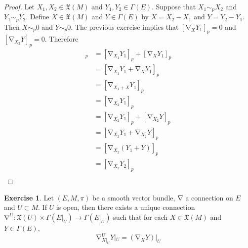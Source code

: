 \documentclass{book}
\theoremstyle{definition}
\newtheorem{ex}[definition]{Exercise}
\newcommand{\Gam}{\Gamma}
\newcommand{\MFX}{\mathfrak{X}}
\DeclareMathOperator{\nab}{\nabla}
\DeclareMathOperator*{\0}{\mbf{0}}
\DeclareMathOperator*{\1}{\mbf{1}}
\begin{document}
	\begin{proof}
		Let $X_1, X_2 \in \MFX(M)$ and $Y_1, Y_2 \in \Gam(E)$. Suppose that $X_1 \sim_p X_2$ and $Y_1 \sim_p Y_2$. Define $X \in \MFX(M)$ and $Y \in \Gam(E)$ by $X = X_2 - X_1$ and $Y = Y_2 - Y_1$. Then $X \sim_p 0$ and $Y \sim_p 0$. The previous exercise implies that $[\nab_{X}Y_1]_p = 0$ and $[\nab_{X_2} Y]_p = 0$. Therefore
		\begin{align*}
			[\nab_{X_1} Y_1]_p
			& = [\nab_{X_1} Y_1]_p + [\nab_X Y_1]_p \\
			& = [\nab_{X_1} Y_1 + \nab_X Y_1]_p \\
			& = [\nab_{X_1 + X} Y_1]_p \\
			& = [\nab_{X_2} Y_1]_p \\
			& = [\nab_{X_2} Y_1]_p + [\nab_{X_2} Y]_p \\
			& = [\nab_{X_2} Y_1 + \nab_{X_2} Y]_p \\
			& = [\nab_{X_2} (Y_1 + Y)]_p \\
			& = [\nab_{X_2} Y_2]_p \\
		\end{align*}
	\end{proof}

	\begin{ex}
		Let $(E, M, \pi)$ be a smooth vector bundle, $\nab$ a connection on $E$ and $U \subset M$. If $U$ is open, then there exists a unique connection $\nab^U: \MFX(U) \times \Gam(E|_U) \rightarrow \Gam(E|_U)$ such that for each $X \in \MFX(M)$ and $Y \in \Gam(E)$, 
		$$\nab^U_{X|_U} Y|_U = (\nab_X Y)|_U$$
	\end{ex}

	

	
	
	
	
	
	
	
	
\end{document}
